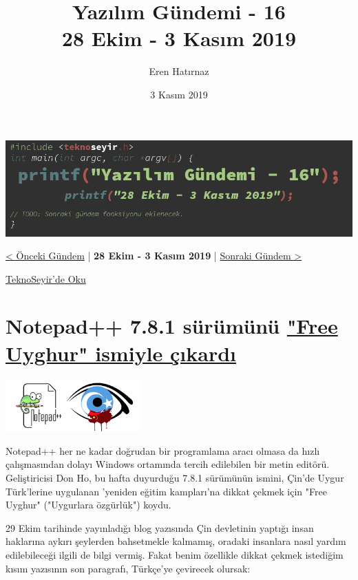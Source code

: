 \documentclass[11pt]{article}
\author{Eren Hatırnaz}
\date{3 Kasım 2019}
\title{Yazılım Gündemi - 16\\\medskip
\large 28 Ekim - 3 Kasım 2019}
\begin{document}
\maketitle
\tableofcontents \clearpage\shorthandoff{=}

\begin{center}
\includegraphics[width=.9\linewidth]{gorseller/yazilim-gundemi-banner.png}
\end{center}

\begin{center}
\href{../15/yazilim-gundemi-15.pdf}{< Önceki Gündem} | \textbf{28 Ekim - 3 Kasım 2019} | \href{../17/yazilim-gundemi-17.pdf}{Sonraki Gündem >}

\href{https://teknoseyir.com/blog/yazilim-gundemi-16-28-ekim-3-kasim-2019}{TeknoSeyir'de Oku}
\end{center}

\section{Notepad++ 7.8.1 sürümünü \href{https://notepad-plus-plus.org/news/v781-free-uyghur-edition/}{"Free Uyghur" ismiyle çıkardı}}
\label{sec:org91d163f}
\begin{center}
\includegraphics[height=2cm]{gorseller/notepadpp-free-uyghur.png}
\end{center}

Notepad++ her ne kadar doğrudan bir programlama aracı olmasa da hızlı
çalışmasından dolayı Windows ortamında tercih edilebilen bir metin editörü.
Geliştiricisi Don Ho, bu hafta duyurduğu 7.8.1 sürümünün ismini, Çin'de Uygur
Türk'lerine uygulanan 'yeniden eğitim kampları'na dikkat çekmek için "Free
Uyghur" ("Uygurlara özgürlük") koydu.

29 Ekim tarihinde yayınladığı blog yazısında Çin devletinin yaptığı insan
haklarına aykırı şeylerden bahsetmekle kalmamış, oradaki insanlara nasıl yardım
edilebileceği ilgili de bilgi vermiş. Fakat benim özellikle dikkat çekmek
istediğim kısım yazısının son paragrafı, Türkçe'ye çevirecek olursak:
\end{document}
